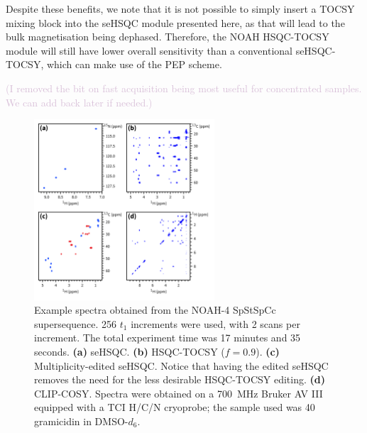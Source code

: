 \documentclass[11pt]{article}
\newcommand*{\carbon}{\ce{^{13}C}}
\newcommand*{\nitrogen}{\ce{^{15}N}}
\newcommand*{\hl}[1]{\textcolor{Thistle}{#1}}
\newcommand*{\grami}{Spectra were obtained on a \SI{700}{\MHz} Bruker AV III equipped with a TCI H/C/N cryoprobe; the sample used was \SI{40}{\milli\molar} gramicidin in DMSO-$d_6$.}
\begin{document}
Despite these benefits, we note that it is not possible to simply insert a TOCSY mixing block into the seHSQC module presented here, as that will lead to the bulk magnetisation being dephased.
Therefore, the NOAH HSQC-TOCSY module will still have lower overall sensitivity than a conventional seHSQC-TOCSY, which can make use of the PEP scheme.

\hl{(I removed the bit on fast acquisition being most useful for concentrated samples. We can add back later if needed.)}



\begin{figure}
    \centering
    \includegraphics[width=0.6\textwidth]{spstspcc.png}
    \caption{
        Example spectra obtained from the NOAH-4 SpStSpCc supersequence.
        256 $t_1$ increments were used, with 2 scans per increment.
        The total experiment time was 17 minutes and 35 seconds.
        \textbf{(a)} \nitrogen{} seHSQC.
        \textbf{(b)} \carbon{} HSQC-TOCSY ($f = 0.9$).
        \textbf{(c)} Multiplicity-edited \carbon{} seHSQC. Notice that having the edited seHSQC removes the need for the less desirable HSQC-TOCSY editing.
        \textbf{(d)} CLIP-COSY.
        \grami{}
    }
    \label{fig:example_spec}
\end{figure}
\end{document}
